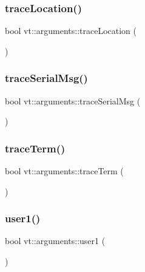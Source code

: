 \subsubsection{\texorpdfstring{trace\+Location()}{traceLocation()}}
{\footnotesize\ttfamily bool vt\+::arguments\+::trace\+Location (\begin{DoxyParamCaption}{ }\end{DoxyParamCaption})\hspace{0.3cm}{\ttfamily [inline]}}

\mbox{\label{namespacevt_1_1arguments_ad239f3b085f99c963780dbcb0efd5668}} 
\subsubsection{\texorpdfstring{trace\+Serial\+Msg()}{traceSerialMsg()}}
{\footnotesize\ttfamily bool vt\+::arguments\+::trace\+Serial\+Msg (\begin{DoxyParamCaption}{ }\end{DoxyParamCaption})\hspace{0.3cm}{\ttfamily [inline]}}

\mbox{\label{namespacevt_1_1arguments_a60b229dc93c6fce2f24faa8237137a89}} 
\subsubsection{\texorpdfstring{trace\+Term()}{traceTerm()}}
{\footnotesize\ttfamily bool vt\+::arguments\+::trace\+Term (\begin{DoxyParamCaption}{ }\end{DoxyParamCaption})\hspace{0.3cm}{\ttfamily [inline]}}

\mbox{\label{namespacevt_1_1arguments_afe229ddf0b473e54fac5ff6884b07ad0}} 
\subsubsection{\texorpdfstring{user1()}{user1()}}
{\footnotesize\ttfamily bool vt\+::arguments\+::user1 (\begin{DoxyParamCaption}{ }\end{DoxyParamCaption})\hspace{0.3cm}{\ttfamily [inline]}}


